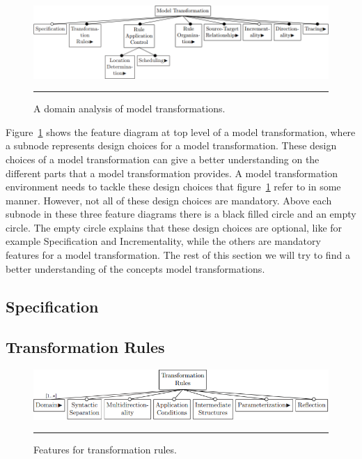 \begin{figure}[H]
  \centering
    \includegraphics[scale=0.65]{./Figures/Model_Transformation_Survey_1.png}
    \rule{35em}{0.5pt}
  \caption[Domain Analysis of Model Transformations]
  				{A domain analysis of model transformations\cite{Czarnecki2006}.}
  \label{fig:Model_Transformation_Survey}
\end{figure}

Figure~\ref{fig:Model_Transformation_Survey} shows the feature diagram at top
level of a model transformation, where a subnode represents design choices for
a model transformation. These design choices of a model transformation can give
a better understanding on the different parts that a model transformation
provides. A model transformation environment needs to tackle these design
choices that figure~\ref{fig:Model_Transformation_Survey} refer to in
some manner. However, not all of these design choices are mandatory. 
Above each subnode in these three feature diagrams there is a black filled
circle and an empty circle. The empty circle explains that these design choices
are optional, like for example Specification and Incrementality, while the
others are mandatory features for a model transformation. The rest of this
section we will try to find a better understanding of the concepts model
transformations. 

\subsection{Specification}



\subsection{Transformation Rules}

\begin{figure}[H]
  \centering
    \includegraphics[scale=0.65]{./Figures/TransformationRules_1.png}
    \rule{35em}{0.5pt}
  \caption[Feature diagram for transformation rules]
  {Features for transformation rules.}
  \label{fig:TransformationRules}
\end{figure}

